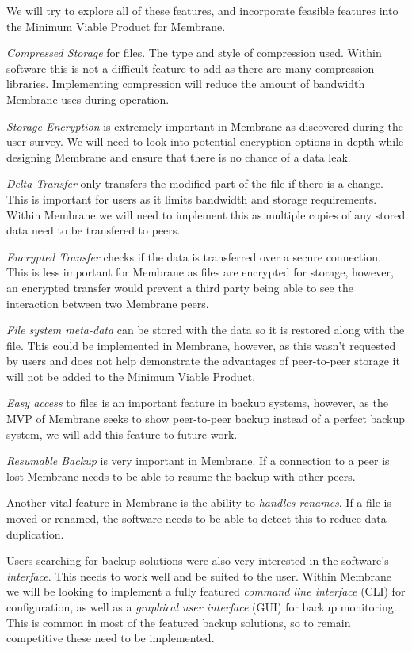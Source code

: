\documentclass[11pt, a4paper, twocolumn, twoside]{report}
\begin{document}
We will try to explore all of these features, and incorporate feasible features into the Minimum Viable Product for Membrane.

\emph{Compressed Storage} for files. The type and style of compression used. Within software this is not a difficult feature to add as there are many compression libraries. Implementing compression will reduce the amount of bandwidth Membrane uses during operation.

\emph{Storage Encryption} is extremely important in Membrane as discovered during the user survey. We will need to look into potential encryption options in-depth while designing Membrane and ensure that there is no chance of a data leak.

\emph{Delta Transfer} only transfers the modified part of the file if there is a change. This is important for users as it limits bandwidth and storage requirements. Within Membrane we will need to implement this as multiple copies of any stored data need to be transfered to peers.

\emph{Encrypted Transfer} checks if the data is transferred over a secure connection. This is less important for Membrane as files are encrypted for storage, however, an encrypted transfer would prevent a third party being able to see the interaction between two Membrane peers.

\emph{File system meta-data} can be stored with the data so it is restored along with the file. This could be implemented in Membrane, however, as this wasn't requested by users and does not help demonstrate the advantages of peer-to-peer storage it will not be added to the Minimum Viable Product.

\emph{Easy access} to files is an important feature in backup systems, however, as the MVP of Membrane seeks to show peer-to-peer backup instead of a perfect backup system, we will add this feature to future work.

\emph{Resumable Backup} is very important in Membrane. If a connection to a peer is lost Membrane needs to be able to resume the backup with other peers.

Another vital feature in Membrane is the ability to \emph{handles renames}. If a file is moved or renamed, the software needs to be able to detect this to reduce data duplication.

Users searching for backup solutions were also very interested in the software's \emph{interface}. This needs to work well and be suited to the user. Within Membrane we will be looking to implement a fully featured \emph{command line interface} (CLI) for configuration, as well as a \emph{graphical user interface}  (GUI) for backup monitoring. This is common in most of the featured backup solutions, so to remain competitive these need to be implemented.
\end{document}
